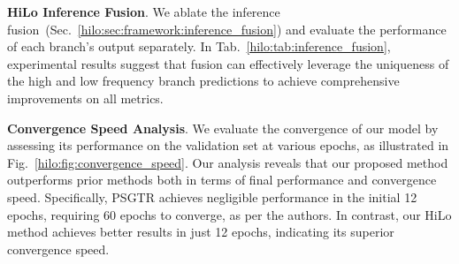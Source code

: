 \begin{table}
\centering
\setlength{\tabcolsep}{10pt}
\caption{Ablation study for different losses in HiLo prediction alignment. \emph{Object} refers to the subject-object consistency loss and \emph{relation} refers to the relation consistency loss. The margin parameter is defined in Eq.~\ref{eq:relation_consistency_loss}.
}
\label{hilo:tab:prediction_alignment}
\end{table}

\noindent \textbf{HiLo Inference Fusion}.
We ablate the inference fusion~(Sec.~\ref{hilo:sec:framework:inference_fusion}) and evaluate the performance of each branch's output separately.
In Tab.~\ref{hilo:tab:inference_fusion}, experimental results suggest that fusion can effectively leverage the uniqueness of the high and low frequency branch predictions to achieve comprehensive improvements on all metrics.

\begin{table}[h]
\centering
\setlength{\tabcolsep}{14pt}
\caption{Ablation study for HiLo inference fusion.}
\label{hilo:tab:inference_fusion}
\end{table}

\noindent \textbf{Convergence Speed Analysis}.
We evaluate the convergence of our model by assessing its performance on the validation set at various epochs, as illustrated in Fig.~\ref{hilo:fig:convergence_speed}.
Our analysis reveals that our proposed method outperforms prior methods \citep{yang2022panoptic} both in terms of final performance and convergence speed.
Specifically, PSGTR \citep{yang2022panoptic} achieves negligible performance in the initial 12 epochs, requiring 60 epochs to converge, as per the authors.
In contrast, our HiLo method achieves better results in just 12 epochs, indicating its superior convergence speed.


